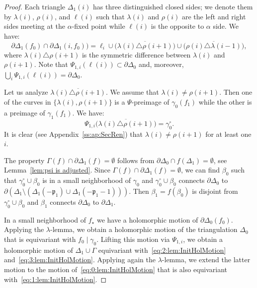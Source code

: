 \documentclass[]{amsart}
\newcommand{\bDelta}{{\mathbb{\Delta}}}
\newcommand{\str}{{\star}}
\newcommand{\pp}{\mathfrak{p}}
\theoremstyle{remark}
\numberwithin{equation}{section}
\theoremstyle{definition}
\begin{document}
\begin{proof}
Each triangle $\Delta_{1}(i)$ has three distinguished closed sides; we denote them by $\lambda(i)$, $\rho(i)$, and $\ell(i)$ such that $\lambda(i)$ and $\rho(i)$ are the left and right sides meeting at the $\alpha$-fixed point while $\ell(i)$ is the opposite to $\alpha$ side. We have:
\[\partial \bDelta_1(f_0)\cap \partial \Delta_1(i,f_0))=\ell_i\cup \big(\overline{\lambda(i)\triangle \rho(i+1)}\big)\cup \big(\overline{\rho(i)\triangle \lambda(i-1)}\big), \]
where $\lambda(i)\triangle \rho(i+1)$ is the symmetric difference between $\lambda(i)$ and $\rho(i+1).$
Note that  $\Psi_{1,i}( \ell (i))\subset \partial \bDelta_0$ and, moreover, $\displaystyle \bigcup_i\Psi_{1,i}(\ell(i)) =\partial \bDelta_0$.

 Let us analyze $ \overline{\lambda(i)\triangle \rho(i+1)}$. We assume that $\lambda(i)\not= \rho(i+1)$. Then one of the curves in $\{\lambda(i), \rho(i+1)\}$ is a $\Psi$-preimage of $\gamma_0(f_1)$ while the other is a preimage of $\gamma_1(f_1)$. We have: 
 \[ \Psi_{1,i}\big(\overline{\lambda(i)\triangle \rho(i+1)}\big)=\gamma_0^\circ.\]
It is clear (see Appendix~\ref{ss:ap:SecRen}) that $\lambda(i)\not= \rho(i+1)$ for at least one $i$.

 
The property  $\Gamma(f)\cap \partial \bDelta_1(f)=\emptyset$ follows from $\partial \bDelta_0\cap f(\bDelta_1)=\emptyset$, see Lemma~\ref{lem:psi is adjusted}. Since $\Gamma(f)\cap \partial \bDelta_1(f)=\emptyset$, we can find $\beta_0$ such that $\gamma_0^\circ\cup \beta_0$ is in a small neighborhood of $\gamma_0$ and $\gamma_0^\circ\cup \beta_0$  connects $\partial \bDelta_0$ to $\partial (\bDelta_1\setminus (\Delta_1(-\pp_1)\cup  \Delta_1(-\pp_1-1)))$. Then $\beta_1=f(\beta_0)$ is disjoint from $\gamma^\circ_0\cup \beta_0$ and $\beta_1$ connects $\partial \bDelta_0$ to $\partial \bDelta_1$.


In a small neighborhood of $f_\str$ we have a holomorphic motion of $\partial \bDelta_0(f_0).$ Applying the $\lambda$-lemma, we obtain a holomorphic motion of the triangulation $\bDelta_0$ that is equivariant with $f_0\mid \gamma_0$. Lifting this motion via $\Psi_{1,i}$, we obtain a holomorphic motion of $\bDelta_1\cup \Gamma$ equivariant with~\eqref{eq:2:lem:InitHolMotion} and~\eqref{eq:3:lem:InitHolMotion}. Applying again the $\lambda$-lemma, we extend the latter motion to the motion of~\eqref{eq:0:lem:InitHolMotion} that is also equivariant with~\eqref{eq:1:lem:InitHolMotion}. 
\end{proof}
\end{document}
